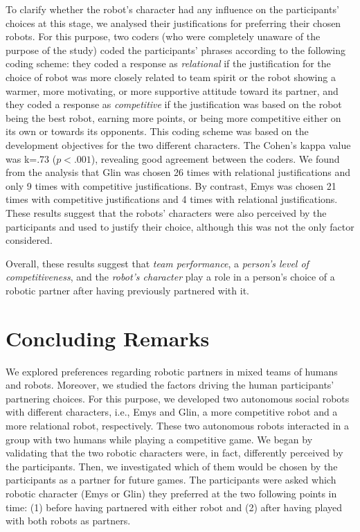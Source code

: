 To clarify whether the robot's character had any influence on the participants' choices at this stage, we analysed their justifications for preferring their chosen robots. For this purpose, two coders (who were completely unaware of the purpose of the study) coded the participants' phrases according to the following coding scheme: they coded a response as \textit{relational} if the justification for the choice of robot was more closely related to team spirit or the robot showing a warmer, more motivating, or more supportive attitude toward its partner, and they coded a response as \textit{competitive} if the justification was based on the robot being the best robot, earning more points, or being more competitive either on its own or towards its opponents. This coding scheme was based on the development objectives for the two different characters. The Cohen's kappa value was k=.73 ($p<.001$), revealing good agreement between the coders. We found from the analysis that Glin was chosen 26 times with relational justifications and only 9 times with competitive justifications. By contrast, Emys was chosen 21 times with competitive justifications and 4 times with relational justifications. 
These results suggest that the robots' characters were also perceived by the participants and used to justify their choice, although this was not the only factor considered.

Overall, these results suggest that \textit{team performance}, a \textit{person's level of competitiveness}, and the \textit{robot's character} play a role in a person's choice of a robotic partner after having previously partnered with it.


\section{Concluding Remarks}
We explored preferences regarding robotic partners in mixed teams of humans and robots. Moreover, we studied the factors driving the human participants' partnering choices. For this purpose, we developed two autonomous social robots with different characters, i.e., Emys and Glin, a more competitive robot and a more relational robot, respectively. These two autonomous robots interacted in a group with two humans while playing a competitive game. We began by validating that the two robotic characters were, in fact, differently perceived by the participants. Then, we investigated which of them would be chosen by the parti\-cipants as a partner for future games. 
The participants were asked which robotic character (Emys or Glin) they preferred at the two following points in time: (1) before having partnered with either robot and (2) after having played with both robots as partners.

